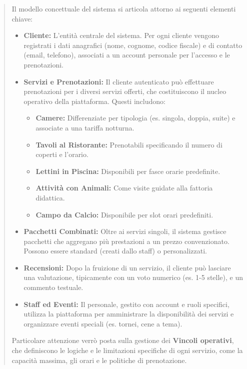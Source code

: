 \documentclass[a4paper,11pt]{report}
\begin{document}
\begin{quote}
Il modello concettuale del sistema si articola attorno ai seguenti elementi chiave:

\begin{itemize}
    \item \textbf{Cliente:} L'entità centrale del sistema. Per ogni cliente vengono registrati i dati anagrafici (nome, cognome, codice fiscale) e di contatto (email, telefono), associati a un account personale per l'accesso e le prenotazioni.

    \item \textbf{Servizi e Prenotazioni:} Il cliente autenticato può effettuare prenotazioni per i diversi servizi offerti, che costituiscono il nucleo operativo della piattaforma. Questi includono:
    \begin{itemize}
        \item \textbf{Camere:} Differenziate per tipologia (es. singola, doppia, suite) e associate a una tariffa notturna.
        \item \textbf{Tavoli al Ristorante:} Prenotabili specificando il numero di coperti e l'orario.
        \item \textbf{Lettini in Piscina:} Disponibili per fasce orarie predefinite.
        \item \textbf{Attività con Animali:} Come visite guidate alla fattoria didattica.
        \item \textbf{Campo da Calcio:} Disponibile per slot orari predefiniti.
    \end{itemize}

    \item \textbf{Pacchetti Combinati:} Oltre ai servizi singoli, il sistema gestisce pacchetti che aggregano più prestazioni a un prezzo convenzionato. Possono essere standard (creati dallo staff) o personalizzati.

    \item \textbf{Recensioni:} Dopo la fruizione di un servizio, il cliente può lasciare una valutazione, tipicamente con un voto numerico (es. 1-5 stelle), e un commento testuale.

    \item \textbf{Staff ed Eventi:} Il personale, gestito con account e ruoli specifici, utilizza la piattaforma per amministrare la disponibilità dei servizi e organizzare eventi speciali (es. tornei, cene a tema).
\end{itemize}

 Particolare attenzione verrò posta sulla gestione dei \textbf{Vincoli operativi}, che definiscono le logiche e le limitazioni specifiche di ogni servizio, come la capacità massima, gli orari e le politiche di prenotazione.
\end{quote}
\end{document}
